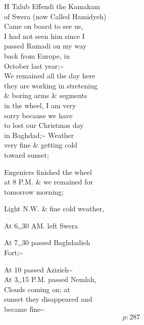 \documentclass{report}
\begin{document}
	\par{
 	H Talub Effendi the Kamakam\ \\of Swera (now Called Hamidyeh)\ \\Came on board to see us,\ \\I had not seen him since I\ \\passed Ramadi on my way\ \\back from Europe, in\ \\October last year;\~{}\ \\We remained all the day here\ \\they are working in stretening\ \\\& boring arms \& segments\ \\in the wheel, I am very\ \\sorry because we have\ \\to lost our Christmas day\ \\in Baghdad;\~{} Weather\ \\very fine \& getting cold\ \\toward sunset;\ \\
	}

	\par{
 	Engeniers finished the wheel\ \\at 8 P.M. \& we remained for\ \\tomorrow morning;\ \\
	}

	\par{
 	Light N.W. \& fine cold weather,\ \\
	}

	\par{
 	At 6,,30 AM. left Swera\ \\
	}

	\par{
 	At 7,,30 passed Baghdadieh\ \\Fort;\~{}\ \\
	}

	\par{
 	At 10 passed Azizieh\~{}\ \\At 3,,15 P.M. passed Nemlah,\ \\Clouds coming on; at\ \\sunset they disappeared and\ \\became fîne\~{}\ \\
  \[p: 287 \]

	}


\end{document}
